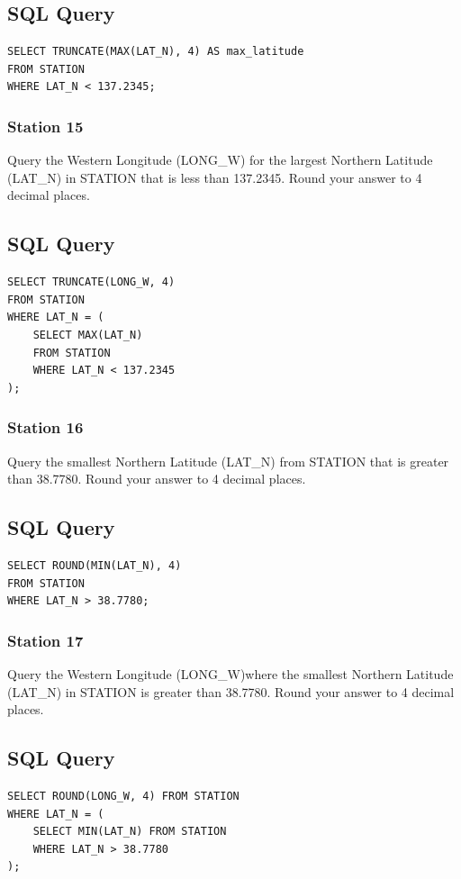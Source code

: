 \documentclass[12pt,a4paper]{article}
\begin{document}
\subsection*{SQL Query}
\begin{lstlisting}[style=sqlstyle]
SELECT TRUNCATE(MAX(LAT_N), 4) AS max_latitude
FROM STATION
WHERE LAT_N < 137.2345;
\end{lstlisting}
\subsubsection{Station 15}
Query the Western Longitude (LONG\_W) for the largest Northern Latitude (LAT\_N) in STATION that is less than 137.2345. Round your answer to 4 decimal places.
\subsection*{SQL Query}
\begin{lstlisting}[style=sqlstyle]
SELECT TRUNCATE(LONG_W, 4)
FROM STATION
WHERE LAT_N = (
    SELECT MAX(LAT_N)
    FROM STATION
    WHERE LAT_N < 137.2345
);
\end{lstlisting}
\subsubsection{Station 16}
Query the smallest Northern Latitude (LAT\_N) from STATION that is greater than 38.7780. Round your answer to 4 decimal places.
\subsection*{SQL Query}
\begin{lstlisting}[style=sqlstyle]
SELECT ROUND(MIN(LAT_N), 4)
FROM STATION
WHERE LAT_N > 38.7780;
\end{lstlisting}
\subsubsection{Station 17}
Query the Western Longitude (LONG\_W)where the smallest Northern Latitude (LAT\_N) in STATION is greater than 38.7780. Round your answer to 4 decimal places.
\subsection*{SQL Query}
\begin{lstlisting}[style=sqlstyle]
SELECT ROUND(LONG_W, 4) FROM STATION
WHERE LAT_N = (
    SELECT MIN(LAT_N) FROM STATION
    WHERE LAT_N > 38.7780
);
\end{lstlisting}
\end{document}
